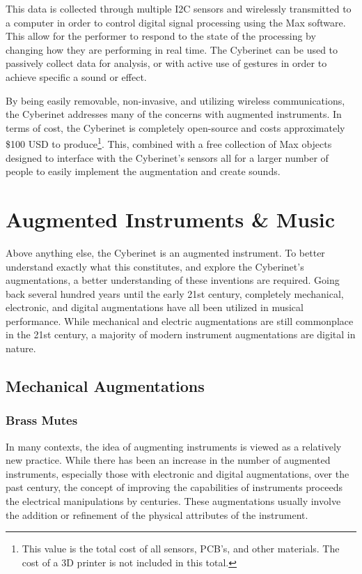This data is collected through multiple I2C sensors and wirelessly transmitted to a computer in order to control digital signal processing using the Max software. This allow for the performer to respond to the state of the processing by changing how they are performing in real time. The Cyberinet can be used to passively collect data for analysis, or with active use of gestures in order to achieve specific a sound or effect.

By being easily removable, non-invasive, and utilizing wireless communications, the Cyberinet addresses many of the concerns with augmented instruments. In terms of cost, the Cyberinet is completely open-source and costs approximately \$100 USD to produce\footnote{This value is the total cost of all sensors, PCB's, and other materials. The cost of a 3D printer is not included in this total.}. This, combined with a free collection of Max objects designed to interface with the Cyberinet's sensors all for a larger number of people to easily implement the augmentation and create sounds.

\section{Augmented Instruments \& Music}


Above anything else, the Cyberinet is an augmented instrument. To better understand exactly what this constitutes, and explore the Cyberinet's augmentations, a better understanding of these inventions are required. Going back several hundred years until the early 21st century, completely mechanical, electronic, and digital augmentations have all been utilized in musical performance. While mechanical and electric augmentations are still commonplace in the 21st century, a majority of modern instrument augmentations are digital in nature.

\subsection{Mechanical Augmentations}

\subsubsection{Brass Mutes}
In many contexts, the idea of augmenting instruments is viewed as a relatively new practice. While there has been an increase in the number of augmented instruments, especially those with electronic and digital augmentations, over the past century, the concept of improving the capabilities of instruments proceeds the electrical manipulations by centuries. These augmentations usually involve the addition or refinement of the physical attributes of the instrument.

